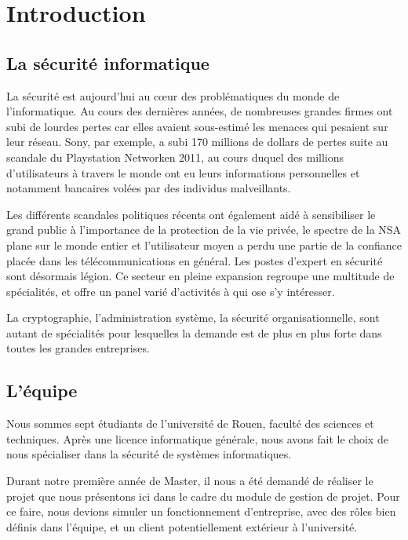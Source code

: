 \chapter{Introduction}

\section{La sécurité informatique}

La sécurité est aujourd'hui au cœur des problématiques du monde de l'informatique. Au cours des dernières années, de nombreuses grandes firmes ont subi de lourdes pertes car elles avaient sous-estimé les menaces qui pesaient sur leur réseau. Sony\textregistered, par exemple, a subi 170 millions de dollars\cite{PSN} de pertes suite au scandale du Playstation Network\texttrademark en 2011, au cours duquel des millions d'utilisateurs à travers le monde ont eu leurs informations personnelles et notamment bancaires volées par des individus malveillants.

 Les différents scandales politiques récents ont également aidé à sensibiliser le grand public à l'importance de la protection de la vie privée, le spectre de la NSA plane sur le monde entier et l'utilisateur moyen a perdu une partie de la confiance placée dans les télécommunications en général. Les postes d'expert en sécurité sont désormais légion. Ce secteur en pleine expansion regroupe une multitude de spécialités, et offre un panel varié d'activités à qui ose s'y intéresser.
 
La cryptographie, l'administration système, la sécurité organisationnelle, sont autant de spécialités pour lesquelles la demande est de plus en plus forte dans toutes les grandes entreprises.

\section{L'équipe}

Nous sommes sept étudiants de l'université de Rouen, faculté des sciences et techniques. Après une licence informatique générale, nous avons fait le choix de nous spécialiser dans la sécurité de systèmes informatiques.

 Durant notre première année de Master, il nous a été demandé de réaliser le projet que nous présentons ici dans le cadre du module de gestion de projet. Pour ce faire, nous devions simuler un fonctionnement d'entreprise, avec des rôles bien définis dans l'équipe, et un client potentiellement extérieur à l'université.
 
